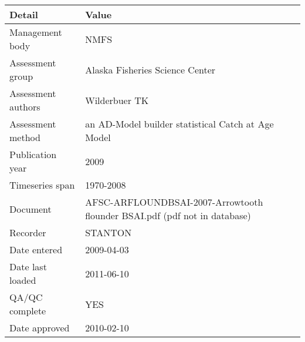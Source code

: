 \begin{table}[htb]
\centering
\begin{tabular}{lp{7cm}}
\toprule
Detail & Value \\
\midrule
Management body    & NMFS                                                                      \\
Assessment group   & Alaska Fisheries Science Center                                           \\
Assessment authors & Wilderbuer TK                                                             \\
Assessment method  & an AD-Model builder statistical Catch at Age Model                        \\
Publication year   & 2009                                                                      \\
Timeseries span    & 1970-2008                                                                 \\
Document           & AFSC-ARFLOUNDBSAI-2007-Arrowtooth flounder BSAI.pdf (pdf not in database) \\
Recorder           & STANTON                                                                   \\
Date entered       & 2009-04-03                                                                \\
Date last loaded   & 2011-06-10                                                                \\
QA/QC complete     & YES                                                                       \\
Date approved      & 2010-02-10                                                                \\
\bottomrule
\end{tabular}
\label{tab:assessdet}
\end{table}
